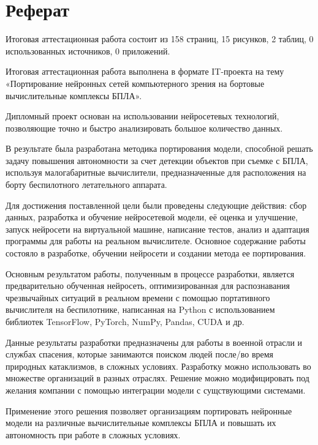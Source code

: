 \chapter*{Реферат}

    Итоговая аттестационная работа состоит из 158 страниц, 15 рисунков, 2 таблиц, 0 использованных источников, 0 приложений.

    Итоговая аттестационная работа выполнена в формате IT-проекта на тему «Портирование нейронных сетей компьютерного зрения на бортовые вычислительные комплексы БПЛА».
    
    Дипломный проект основан на использовании нейросетевых технологий, позволяющие точно и быстро анализировать большое количество данных.
    
    В результате была разработана методика портирования модели, способной решать задачу повышения автономности за счет детекции объектов при съемке с БПЛА, используя малогабаритные вычислители, предназначенные для расположения на борту беспилотного летательного аппарата.
    
    Для достижения поставленной цели были проведены следующие действия: сбор данных, разработка и обучение нейросетевой модели, её оценка и улучшение, запуск нейросети на виртуальной машине, написание тестов, анализ и адаптация программы для работы на реальном вычислителе. Основное содержание работы состояло в разработке,  обучении нейросети и создании метода ее портирования. 
    
    Основным результатом работы, полученным в процессе разработки, является предварительно обученная нейросеть, оптимизированная для распознавания чрезвычайных ситуаций в реальном времени с помощью портативного вычислителя на беспилотнике, написанная на Python с использованием библиотек TensorFlow, PyTorch, NumPy, Pandas, CUDA и др.
    
    Данные результаты разработки предназначены для работы в военной отрасли и службах спасения, которые занимаются поиском людей после/во время природных катаклизмов, в сложных условиях. Разработку можно использовать во множестве организаций в разных отраслях. Решение можно модифицировать под желания компании с помощью интеграции модели с сущствующими системами.
    
    Применение этого решения позволяет организациям портировать нейронные модели на различные вычислительные комплексы БПЛА и повышать их автономность при работе в сложных условиях.

\endinput